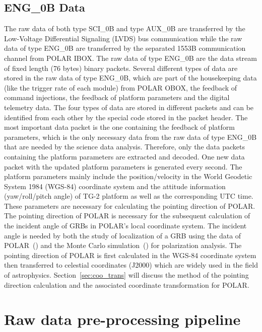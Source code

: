 \documentclass{raa}
\begin{document}
\subsection{ENG\_0B Data}
The raw data of both type SCI\_0B and type AUX\_0B are transferred by the Low-Voltage Differential Signaling (LVDS) bus communication while the raw data of type ENG\_0B are transferred by the separated 1553B communication channel from POLAR IBOX. The raw data of type ENG\_0B are the data stream of fixed length (76 bytes) binary packets. Several different types of data are stored in the raw data of type ENG\_0B, which are part of the housekeeping data (like the trigger rate of each module) from POLAR OBOX, the feedback of command injections, the feedback of platform parameters and the digital telemetry data. The four types of data are stored in different packets and can be identified from each other by the special code stored in the packet header. The most important data packet is the one containing the feedback of platform parameters, which is the only necessary data from the raw data of type ENG\_0B that are needed by the science data analysis. Therefore, only the data packets containing the platform parameters are extracted and decoded. One new data packet with the updated platform parameters is generated every second. The platform parameters mainly include the position/velocity in the World Geodetic System 1984 (WGS-84) coordinate system and the attitude information (yaw/roll/pitch angle) of TG-2 platform as well as the corresponding UTC time. These parameters are necessary for calculating the pointing direction of POLAR. The pointing direction of POLAR is necessary for the subsequent calculation of the incident angle of GRBs in POLAR's local coordinate system. The incident angle is needed by both the study of localization of a GRB using the data of POLAR~(\citealt{SUAREZGARCIA2010624}) and the Monte Carlo simulation~(\citealt{Kole2017}) for polarization analysis. The pointing direction of POLAR is first calculated in the WGS-84 coordinate system then transferred to celestial coordinates (J2000) which are widely used in the field of astrophysics. Section~\ref{sec:coo_trans} will discuss the method of the pointing direction calculation and the associated coordinate transformation for POLAR.

\section{Raw data pre-processing pipeline}
\end{document}
